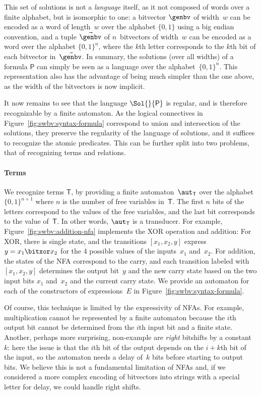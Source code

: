 %
This set of solutions is not a \emph{language} itself, as it not composed of
words over a finite alphabet, but is isomorphic to one: a bitvector $\genbv$ of
width~$w$ can be encoded as a word of length~$w$ over the alphabet $\{0,1\}$
using a big endian convention, and a tuple $\vec\genbv$ of $n$~bitvectors of
width~$w$ can be encoded as a word over the alphabet $\{0, 1\}^n$, where the $k$th letter
corresponds to the $k$th bit of each bitvector in~$\vec{\genbv}$.
%
In summary, the solutions (over all widths) of a formula $\mathsf{P}$ can simply
be seen as a language over the alphabet~$\{0,1\}^n$.
%
This representation also has the advantage of being much simpler than the one
above, as the width of the bitvectors is now implicit.

It now remains to see that the language $\Sol{}{\mathsf{P}}$ is regular, and is
therefore recognizable by a finite automaton.
%
As the logical connectives in Figure~\ref{fig:swbv:syntax-formula} correspond to union
and intersection of the solutions, they preserve the regularity of the language
of solutions, and it suffices to recognize the atomic predicates.
%
This can be further split into two problems, that of recognizing terms and relations.

\paragraph{Terms}
We recognize terms $\mathsf{T}$, by providing a finite
automaton~$\aut_{\mathsf{T}}$ over the alphabet~$\{0,1\}^{n+1}$ where $n$ is
the number of free variables in~$\mathsf{T}$. The first $n$ bits of the
letters correspond to the values of the free variables, and the last bit
corresponds to the value of~$\mathsf{T}$. In other words, $\aut_{\mathsf{T}}$
is a transducer. For example, Figure~\ref{fig:swbv:addition-nfa} implements the XOR
operation and addition:
%
For XOR, there is single state, and the transitions $[x_1, x_2, y]$
express $y = x_1 \bitxor x_2$ for the 4 possible values of the
inputs~$x_1$ and~$x_2$.
%
For addition, the states of the NFA correspond to the carry, and each
transition labeled with $[x_1, x_2, y]$ determines the output bit~$y$ and the
new carry state based on the two input bits $x_1$ and~$x_2$ and the current
carry state.
%
We provide an automaton for each of the constructors of
expressions~$E$ in Figure~\ref{fig:swbv:syntax-formula}.

Of course, this technique is limited by the expressivity of NFAs.
%
For example, multiplication cannot be represented by a finite automaton
because the $i$th output bit cannot be determined from the $i$th input bit and
a finite state.
%
Another, perhaps more surprising, non-example are \emph{right} bitshifts by a
constant~$k$: here the issue is that the $i$th bit of the output depends on the
$i+k$th bit of the input, so the automaton needs a delay of~$k$ bits before
starting to output bits.
%
We believe this is not a fundamental limitation of NFAs and, if we considered
a more complex encoding of bitvectors into strings with a special letter for
delay, we could handle right shifts.

